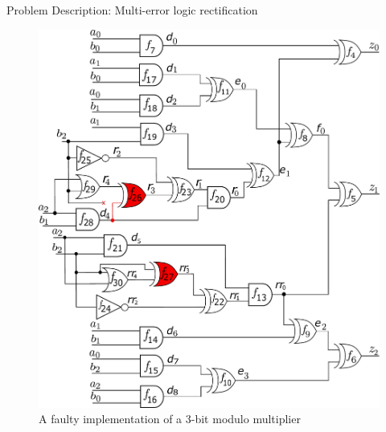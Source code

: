 \begin{frame}{\large Problem Description: Multi-error logic rectification}

\begin{figure}[hbt]
\centering
\includegraphics[scale=0.26]{mas_3_ddc_mfr_a.pdf}
\caption*{A faulty implementation of a 3-bit modulo multiplier
}\label{fig:mas_bug_Wa}
\end{figure}
\end{frame}


